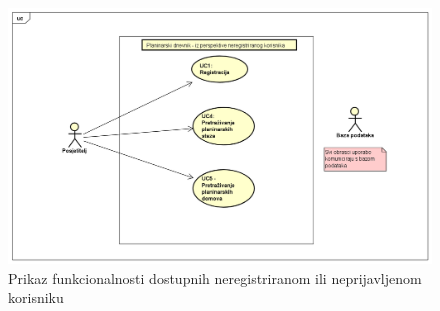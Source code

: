 				\begin{figure}[H]
					\includegraphics[scale=0.5]{dijagrami/posjetitelj-funkcionalnosti.png} %
					\centering
					\caption{Prikaz funkcionalnosti dostupnih neregistriranom ili neprijavljenom korisniku}
					\label{fig:UC dijagrami}
				\end{figure}
		
